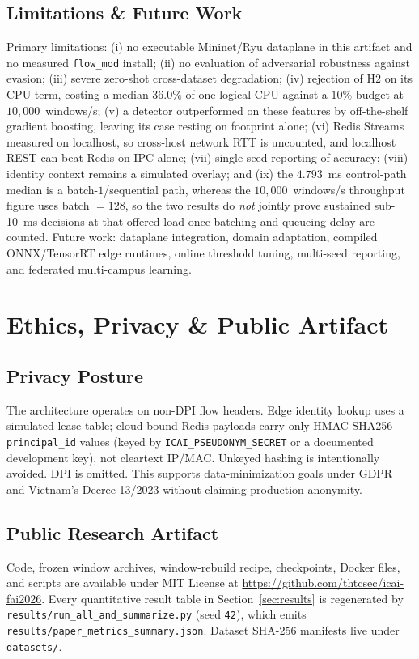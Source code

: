 \documentclass[conference,a4paper]{IEEEtran}
\begin{document}
\subsection{Limitations \& Future Work}
Primary limitations: (i) no executable Mininet/Ryu dataplane in this artifact and no measured \texttt{flow\_mod} install; (ii) no evaluation of adversarial robustness against evasion; (iii) severe zero-shot cross-dataset degradation; (iv) rejection of H2 on its CPU term, costing a median $36.0\%$ of one logical CPU against a $10\%$ budget at $10{,}000$~windows/s; (v) a detector outperformed on these features by off-the-shelf gradient boosting, leaving its case resting on footprint alone; (vi) Redis Streams measured on localhost, so cross-host network RTT is uncounted, and localhost REST can beat Redis on IPC alone; (vii) single-seed reporting of accuracy; (viii) identity context remains a simulated overlay; and (ix) the $4.793$~ms control-path median is a batch-$1$/sequential path, whereas the $10{,}000$~windows/s throughput figure uses batch $=128$, so the two results do \emph{not} jointly prove sustained sub-10~ms decisions at that offered load once batching and queueing delay are counted. Future work: dataplane integration, domain adaptation, compiled ONNX/TensorRT edge runtimes, online threshold tuning, multi-seed reporting, and federated multi-campus learning.

\section{Ethics, Privacy \& Public Artifact}
\subsection{Privacy Posture}
The architecture operates on non-DPI flow headers. Edge identity lookup uses a simulated lease table; cloud-bound Redis payloads carry only HMAC-SHA256 \texttt{principal\_id} values (keyed by \texttt{ICAI\_PSEUDONYM\_SECRET} or a documented development key), not cleartext IP/MAC. Unkeyed hashing is intentionally avoided. DPI is omitted. This supports data-minimization goals under GDPR and Vietnam's Decree 13/2023 without claiming production anonymity.

\subsection{Public Research Artifact}
Code, frozen window archives, window-rebuild recipe, checkpoints, Docker files, and scripts are available under MIT License at \url{https://github.com/thtcsec/icai-fai2026}. Every quantitative result table in Section~\ref{sec:results} is regenerated by \texttt{results/run\_all\_and\_summarize.py} (seed \texttt{42}), which emits \texttt{results/paper\_metrics\_summary.json}. Dataset SHA-256 manifests live under \texttt{datasets/}.
\end{document}
